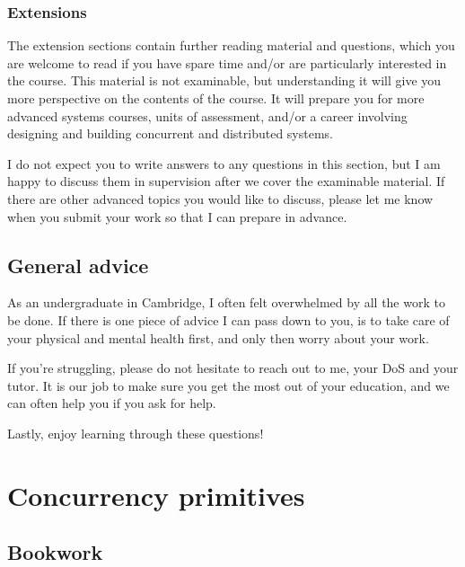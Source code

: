 \documentclass[12pt,a4paper,oneside,openright]{report}
\begin{document}
\subsection*{Extensions}

The extension sections contain further reading material and questions,
which you are welcome to read if you have spare time and/or are
particularly interested in the course. This material is not
examinable, but understanding it will give you more perspective on the
contents of the course. It will prepare you for more advanced
systems courses, units of assessment, and/or a career involving
designing and building concurrent and distributed systems.

I do not expect you to write answers to any questions in this section,
but I am happy to discuss them in supervision after we cover the
examinable material. If there are other advanced topics you would like
to discuss, please let me know when you submit your work so that I can
prepare in advance.

\section*{General advice}

As an undergraduate in Cambridge, I often felt overwhelmed by all the
work to be done. If there is one piece of advice I can pass down to
you, is to take care of your physical and mental health first, and
only then worry about your work.

If you're struggling, please do not hesitate to reach out to me, your
DoS and your tutor. It is our job to make sure you get the most out of
your education, and we can often help you if you ask for help.

Lastly, enjoy learning through these questions!

\newpage




\chapter{Concurrency primitives}
\pagestyle{headings} 

\section{Bookwork}
\end{document}

